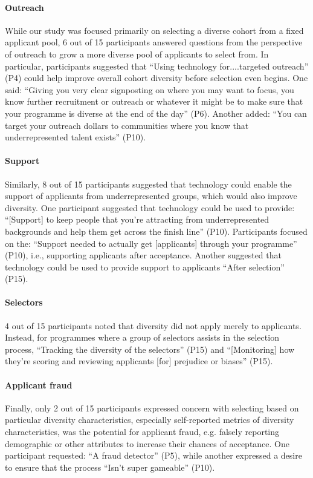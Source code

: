 \paragraph{Outreach}
While our study was focused primarily on selecting a diverse cohort from a fixed applicant pool, 6 out of 15 participants answered questions from the perspective of outreach to grow a more diverse pool of applicants to select from. In particular, participants suggested that ``Using technology for....targeted outreach'' (P4) could help improve overall cohort diversity before selection even begins. One said: ``Giving you very clear signposting on where you may want to focus, you know further recruitment or outreach or whatever it might be to make sure that your programme is diverse at the end of the day'' (P6). Another added: ``You can target your outreach dollars to communities where you know that underrepresented talent exists'' (P10).

\paragraph{Support}
Similarly, 8 out of 15 participants suggested that technology could enable the support of applicants from underrepresented groups, which would also improve diversity. One participant suggested that technology could be used to provide: ``[Support] to keep people that you're attracting from underrepresented backgrounds and help them get across the finish line'' (P10). Participants focused on the: ``Support needed to actually get [applicants] through your programme'' (P10), i.e., supporting applicants after acceptance. Another suggested that technology could be used to provide support to applicants ``After selection'' (P15).

\paragraph{Selectors}
4 out of 15 participants noted that diversity did not apply merely to applicants. Instead, for programmes where a group of selectors assists in the selection process, ``Tracking the diversity of the selectors'' (P15) and ``[Monitoring] how they're scoring and reviewing applicants [for] prejudice or biases'' (P15).

\paragraph{Applicant fraud}
Finally, only 2 out of 15 participants expressed concern with selecting based on particular diversity characteristics, especially self-reported metrics of diversity characteristics, was the potential for applicant fraud, e.g. falsely reporting demographic or other attributes to increase their chances of acceptance. One participant requested: ``A fraud detector'' (P5), while another expressed a desire to ensure that the process ``Isn't super gameable'' (P10).

